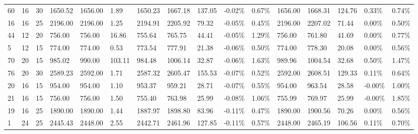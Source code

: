 \begin{longtable}{l|ll|lll|lllll|lllll}
   60 & 16                         & 30                         & 1650.52                   & 1656.00     & 1.89                & 1650.23 & 1667.18 & 137.05 & -0.02\% & 0.67\% & 1656.00 & 1668.31 & 124.76 & 0.33\%  & 0.74\% \\
   16 & 16                         & 25                         & 2196.00                   & 2196.00     & 1.25                & 2194.91 & 2205.92 & 79.32  & -0.05\% & 0.45\% & 2196.00 & 2207.02 & 71.44  & 0.00\%  & 0.50\% \\
   44 & 12                         & 20                         & 756.00                    & 756.00      & 16.86               & 755.64  & 765.75  & 44.41  & -0.05\% & 1.29\% & 756.00  & 761.80  & 41.69  & 0.00\%  & 0.77\% \\
   5  & 12                         & 15                         & 774.00                    & 774.00      & 0.53                & 773.54  & 777.91  & 21.38  & -0.06\% & 0.50\% & 774.00  & 778.30  & 20.08  & 0.00\%  & 0.56\% \\
   70 & 20                         & 15                         & 985.02                    & 990.00      & 103.11              & 984.48  & 1006.14 & 32.87  & -0.06\% & 1.63\% & 989.96  & 1004.54 & 32.68  & 0.50\%  & 1.47\% \\
   76 & 20                         & 30                         & 2589.23                   & 2592.00     & 1.71                & 2587.32 & 2605.47 & 155.53 & -0.07\% & 0.52\% & 2592.00 & 2608.51 & 129.33 & 0.11\%  & 0.64\% \\
   20 & 16                         & 15                         & 954.00                    & 954.00      & 1.10                & 953.37  & 959.21  & 28.71  & -0.07\% & 0.55\% & 954.00  & 963.54  & 28.58  & -0.00\% & 1.00\% \\
   21 & 16                         & 15                         & 756.00                    & 756.00      & 1.50                & 755.40  & 763.98  & 25.99  & -0.08\% & 1.06\% & 755.99  & 769.97  & 25.99  & -0.00\% & 1.85\% \\
   19 & 16                         & 25                         & 1890.00                   & 1890.00     & 1.44                & 1887.97 & 1898.80 & 83.96  & -0.11\% & 0.47\% & 1890.00 & 1900.56 & 70.26  & 0.00\%  & 0.56\% \\
   1  & 24                         & 25                         & 2445.43                   & 2448.00     & 2.55                & 2442.71 & 2461.96 & 127.85 & -0.11\% & 0.57\% & 2448.00 & 2465.19 & 106.56 & 0.11\%  & 0.70\% \\

\end{longtable}
